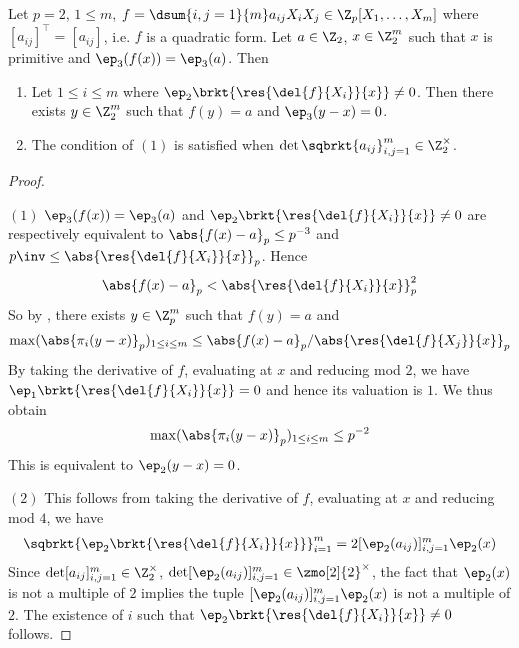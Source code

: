 \begin{prop}[Lifting Solutions of Quadratic Forms for $p = 2$]
  
  Let $p = 2$, $1 \leq m$, 
  $f = \dsum{i,j = 1}{m} a_{ij}X_iX_j \in \Z_p[X_1,\dots,X_m]$ where 
  $[a_{ij}]^\top = [a_{ij}]$, i.e. $f$ is a quadratic form. 
  Let $a \in \Z_2$, $x \in \Z_2^m$ such that 
  $x$ is primitive and $\ep_3(f(x)) = \ep_3(a)$. 
  Then \begin{enumerate}
    \item Let $1 \leq i \leq m$ where 
    $\ep_2\brkt{\res{\del{f}{X_i}}{x}} \neq 0$.
    Then there exists $y \in \Z_2^m$ such that $f(y) = a$ and 
    $\ep_3(y - x) = 0$. 
    \item The condition of $(1)$ is satisfied when 
    $\det\sqbrkt{a_{ij}}_{i,j = 1}^m \in \Z_2^\times$. 
  \end{enumerate}
\end{prop}
\begin{proof}~

  $(1)$
  $\ep_3(f(x)) = \ep_3(a)$ and 
  $\ep_2\brkt{\res{\del{f}{X_i}}{x}} \neq 0$ are respectively equivalent to
  $\abs{f(x) - a}_p \leq p^{-3}$ and $p\inv \leq \abs{\res{\del{f}{X_i}}{x}}_p$.
  Hence \[
    \abs{f(x) - a}_p < \abs{\res{\del{f}{X_i}}{x}}_p^2
  \]
  So by , 
  there exists $y \in \Z_p^m$ such that 
  $f(y) = a$ and \[
    \max(\abs{\pi_i(y - x)}_p)_{1\leq i \leq m} 
    \leq {\abs{f(x) - a}_p}/{\abs{\res{\del{f}{X_j}}{x}}_p}
  \]
  By taking the derivative of $f$, evaluating at $x$ and 
  reducing mod $2$, we have $\ep_1\brkt{\res{\del{f}{X_i}}{x}} = 0$ 
  and hence its valuation is $1$.
  We thus obtain \[
    \max(\abs{\pi_i(y - x)}_p)_{1\leq i \leq m} 
    \leq p^{-2}
  \]
  This is equivalent to $\ep_2(y - x) = 0$.

  $(2)$ This follows from taking the derivative of $f$,
  evaluating at $x$ and reducing mod $4$, we have 
  \begin{align*}
    \sqbrkt{\ep_2\brkt{\res{\del{f}{X_i}}{x}}}_{i = 1}^m 
    = 2 [\ep_2(a_{ij})]_{i,j = 1}^m \ep_2(x)
  \end{align*}
  Since $\det [a_{ij}]_{i,j = 1}^m \in \Z_2^\times$, 
  $\det [\ep_2(a_{ij})]_{i,j = 1}^m \in \zmo[2]{2}^\times$,
  the fact that $\ep_2(x)$ is not a multiple of $2$ implies the tuple
  $[\ep_2(a_{ij})]_{i,j = 1}^m \ep_2(x)$ is not a multiple of $2$.
  The existence of $i$ such that $\ep_2\brkt{\res{\del{f}{X_i}}{x}} \neq 0$
  follows. 
\end{proof}

